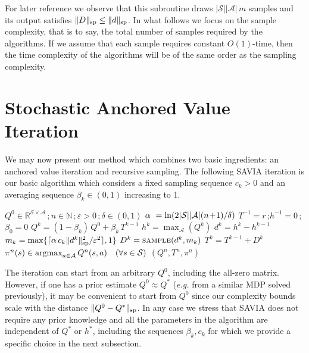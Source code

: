 \documentclass{article}
\newcommand{\Argmax}{\mathop{\rm argmax}}
\newcommand{\cA}{\mathcal{A}}
\newcommand{\cS}{\mathcal{S}}
\newcommand{\real}{\mathbb{R}}
\newcommand{\NN}{\mathbb{N}}
\renewcommand{\sp}[1]{\|{#1}\|_\text{\rm sp}}
\newcommand{\maxA}{\mbox{$\max_\cA$}}
\newcommand{\R}{r}
\theoremstyle{plain}
\theoremstyle{definition}
\theoremstyle{remark}
\begin{document}
For later reference we observe that this subroutine draws $|\cS||\cA|\,m$ 
samples and its output satisfies $\sp{D}\leq\sp{d}$.
In what follows we focus on the 
sample complexity, that is to say, the total number of samples 
required by the algorithms. If we assume that each sample requires constant $O(1)$-time, then the time complexity of the algorithms will be of the same order as the sampling complexity.
\section{Stochastic Anchored Value Iteration}

 We may now present our method which combines two basic ingredients: an anchored value iteration and recursive sampling. The following {SAVIA} iteration is our basic algorithm which considers a fixed sampling sequence $c_k>0$ and an averaging sequence 
$\beta_k\in (0,1)$ increasing to 1. 
\begin{algorithm}[ht!]
   \caption{\mbox{\sc \mbox{ SAVIA}}$(Q^0,n,\varepsilon,\delta)$}
   \label{alg:example}
\begin{algorithmic}
      $Q^{0}\!\in\real^{\cS\times\cA}$\,;\,$n\in\NN$\,;\,$\varepsilon>0$\,;\,$\delta\in(0,1)$
   \STATE $\alpha\hspace{0.8ex}=\ln(2|\cS||\cA|(n\!+\!1)/\delta)$
   \STATE $T^{-1}=\R$\,;\;$h^{-1}=0$\,;\,$\beta_0=0$
     \STATE $Q^{k} =(1\!-\!\beta_k)\,Q^0+\beta_k\, T^{k-1}$
     \STATE $h^k= \maxA(Q^{k})$
     \STATE $d^k=h^k-h^{k-1}$
    \STATE $m_k= \max\{\lceil \alpha\,c_k\sp{d^k}^2/\varepsilon^{2}\rceil,1\}$
     \STATE $D^k=\mbox{\sc sample}(d^k, m_k)$ 
     \STATE $T^k=T^{k-1}+D^k$ 
   \ENDFOR
   \STATE $\pi^{n}(s) \in \Argmax_{a\in \cA} Q^{n}(s,a)\quad(\forall s\in\cS)$
    $(Q^{n} ,T^n, \pi^{n})$ 
\end{algorithmic}
\end{algorithm}


The iteration can start from an arbitrary $Q^0$, including the all-zero matrix. However, if one has a prior estimate $Q^0\approx Q^*$ ({\em e.g.} from a similar MDP solved previously), it may be convenient to start from $Q^0$ since our complexity bounds scale with the distance $\sp{Q^0-Q^*}$. In any case we stress that \mbox{\rm SAVIA}  does not require any prior knowledge and all the parameters in the algorithm are independent of $Q^*$ or $h^*$, including the sequences $\beta_k, c_k$ for which we provide a specific choice in the next subsection. 
\end{document}
